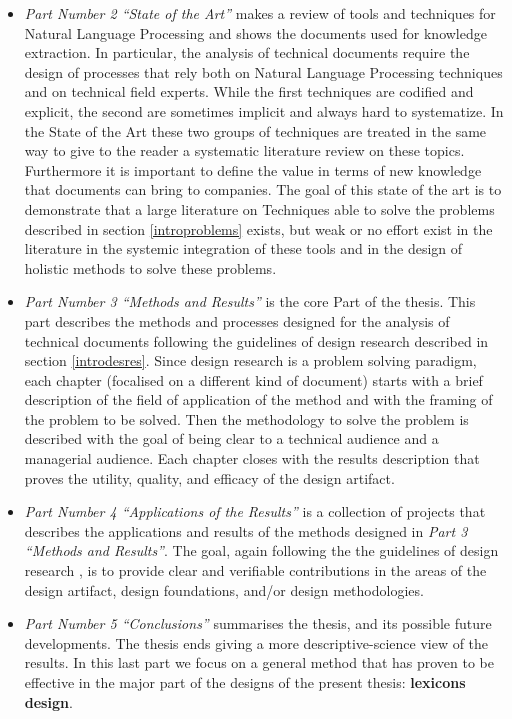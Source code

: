 \documentclass[b5paper,]{book}
\theoremstyle{definition}
\theoremstyle{definition}
\theoremstyle{definition}
\theoremstyle{remark}
\begin{document}
\begin{itemize}
\item
  \emph{Part Number 2 ``State of the Art''} makes a review of tools and
  techniques for Natural Language Processing and shows the documents
  used for knowledge extraction. In particular, the analysis of
  technical documents require the design of processes that rely both on
  Natural Language Processing techniques and on technical field experts.
  While the first techniques are codified and explicit, the second are
  sometimes implicit and always hard to systematize. In the State of the
  Art these two groups of techniques are treated in the same way to give
  to the reader a systematic literature review on these topics.
  Furthermore it is important to define the value in terms of new
  knowledge that documents can bring to companies. The goal of this
  state of the art is to demonstrate that a large literature on
  Techniques able to solve the problems described in section
  \ref{introproblems} exists, but weak or no effort exist in the
  literature in the systemic integration of these tools and in the
  design of holistic methods to solve these problems.
\item
  \emph{Part Number 3 ``Methods and Results''} is the core Part of the
  thesis. This part describes the methods and processes designed for the
  analysis of technical documents following the guidelines of design
  research described in section \ref{introdesres}. Since design research
  is a problem solving paradigm, each chapter (focalised on a different
  kind of document) starts with a brief description of the field of
  application of the method and with the framing of the problem to be
  solved. Then the methodology to solve the problem is described with
  the goal of being clear to a technical audience and a managerial
  audience. Each chapter closes with the results description that proves
  the utility, quality, and efficacy of the design artifact.
\item
  \emph{Part Number 4 ``Applications of the Results''} is a collection
  of projects that describes the applications and results of the methods
  designed in \emph{Part 3 ``Methods and Results''}. The goal, again
  following the the guidelines of design research
  \citep{bichler2006design}, is to provide clear and verifiable
  contributions in the areas of the design artifact, design foundations,
  and/or design methodologies.
\item
  \emph{Part Number 5 ``Conclusions''} summarises the thesis, and its
  possible future developments. The thesis ends giving a more
  descriptive-science view of the results. In this last part we focus on
  a general method that has proven to be effective in the major part of
  the designs of the present thesis: \textbf{lexicons design}.
\end{itemize}
\end{document}
